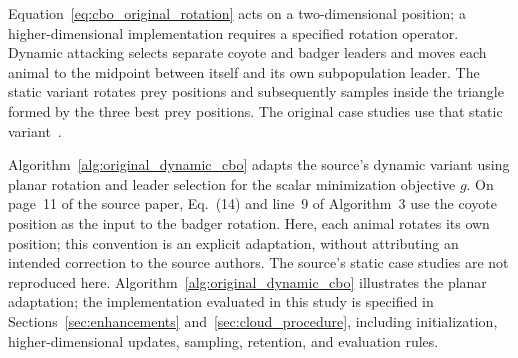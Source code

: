\documentclass[pdflatex,onecolumn,sn-mathphys-num]{sn-jnl}
\begin{document}
Equation~\eqref{eq:cbo_original_rotation} acts on a two-dimensional position; a higher-dimensional implementation requires a specified rotation operator. Dynamic attacking selects separate coyote and badger leaders and moves each animal to the midpoint between itself and its own subpopulation leader. The static variant rotates prey positions and subsequently samples inside the triangle formed by the three best prey positions. The original case studies use that static variant~\cite{Khatab2025}.

Algorithm~\ref{alg:original_dynamic_cbo} adapts the source's dynamic variant using planar rotation and leader selection for the scalar minimization objective $g$. On page~11 of the source paper, Eq.~(14) and line~9 of Algorithm~3 use the coyote position as the input to the badger rotation. Here, each animal rotates its own position; this convention is an explicit adaptation, without attributing an intended correction to the source authors. The source's static case studies are not reproduced here. Algorithm~\ref{alg:original_dynamic_cbo} illustrates the planar adaptation; the implementation evaluated in this study is specified in Sections~\ref{sec:enhancements} and~\ref{sec:cloud_procedure}, including initialization, higher-dimensional updates, sampling, retention, and evaluation rules.
\end{document}
